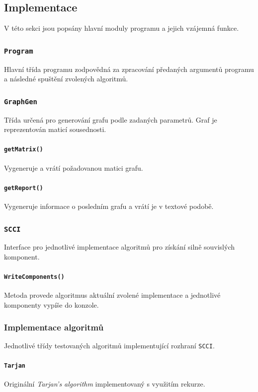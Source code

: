 \documentclass[12pt]{article}
\begin{document}
\subsection{Implementace}
V této sekci jsou popsány hlavní moduly programu a jejich vzájemná funkce.

\subsubsection{\texttt{Program}}
Hlavní třída programu zodpovědná za zpracování předaných argumentů programu a následné spuštění zvolených algoritmů.

\subsubsection{\texttt{GraphGen}}
Třída určená pro generování grafu podle zadaných parametrů. Graf je reprezentován maticí sousednosti.

\paragraph{\texttt{getMatrix()}}
Vygeneruje a vrátí požadovanou matici grafu.

\paragraph{\texttt{getReport()}}
Vygeneruje informace o posledním grafu a vrátí je v textové podobě.

\subsubsection{\texttt{SCCI}}
Interface pro jednotlivé implementace algoritmů pro získání silně souvislých komponent.

\paragraph{\texttt{WriteComponents()}}
Metoda provede algoritmus aktuální zvolené implementace a jednotlivé komponenty vypíše do konzole.

\pagebreak
\subsubsection{Implementace algoritmů}
Jednotlivé třídy testovaných algoritmů implementující rozhraní \texttt{SCCI}.

\paragraph{\texttt{Tarjan}}
Originální \textit{Tarjan's algorithm} implementovaný s využitím rekurze.
\end{document}
